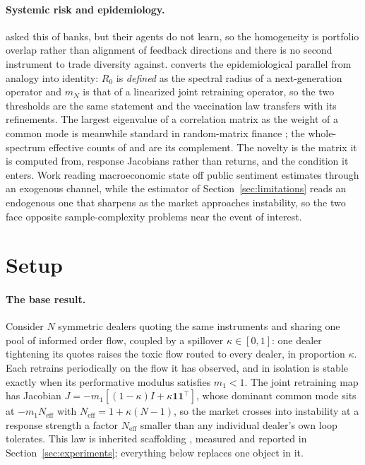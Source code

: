 \documentclass{article}
\theoremstyle{plain}
\theoremstyle{definition}
\newcommand{\Neff}{N_{\mathrm{eff}}}
\newcommand{\mN}{m_N}
\begin{document}
\paragraph{Systemic risk and epidemiology.}
\citet{beale2011} asked this of banks, but their agents do not learn, so the homogeneity is portfolio overlap rather than alignment of feedback directions and there is no second instrument to trade diversity against. \citet{diekmann1990} converts the epidemiological parallel from analogy into identity: $R_0$ is \emph{defined} as the spectral radius of a next-generation operator and $\mN$ is that of a linearized joint retraining operator, so the two thresholds are the same statement and the vaccination law transfers with its refinements. The largest eigenvalue of a correlation matrix as the weight of a common mode is meanwhile standard in random-matrix finance \citep{laloux1999,plerou2002}; the whole-spectrum effective counts of \citet{roy2007} and \citet{hill1973} are its complement. The novelty is the matrix it is computed from, response Jacobians rather than returns, and the condition it enters. Work reading macroeconomic state off public sentiment \citep{pebsa2024} estimates through an exogenous channel, while the estimator of Section~\ref{sec:limitations} reads an endogenous one that sharpens as the market approaches instability, so the two face opposite sample-complexity problems near the event of interest.

\section{Setup}
\label{sec:setup}

\paragraph{The base result.}
Consider $N$ symmetric dealers quoting the same instruments and sharing one pool of informed order flow, coupled by a spillover $\kappa \in [0,1]$: one dealer tightening its quotes raises the toxic flow routed to every dealer, in proportion $\kappa$. Each retrains periodically on the flow it has observed, and in isolation is stable exactly when its performative modulus satisfies $m_1 < 1$. The joint retraining map has Jacobian $J = -m_1[(1-\kappa)I + \kappa \mathbf{1}\mathbf{1}^{\top}]$, whose dominant common mode sits at $-m_1 \Neff$ with $\Neff = 1+\kappa(N-1)$, so the market crosses into instability at a response strength a factor $\Neff$ smaller than any individual dealer's own loop tolerates. This law is inherited scaffolding \citep{reflex2026}, measured and reported in Section~\ref{sec:experiments}; everything below replaces one object in it.
\end{document}
